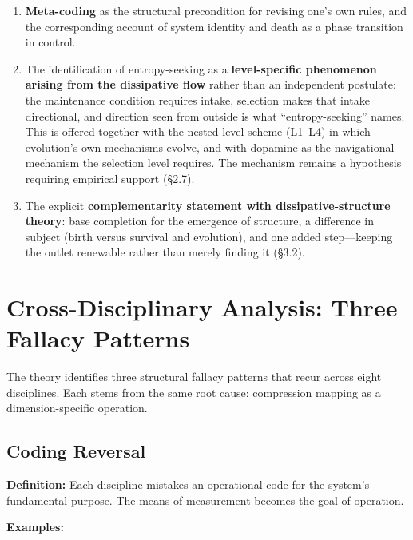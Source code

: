 \documentclass[11pt,a4paper]{article}
\begin{document}
\begin{enumerate}
    \item \textbf{Meta-coding} as the structural precondition for revising one's own rules, and the corresponding account of system identity and death as a phase transition in control.

    \item The identification of entropy-seeking as a \textbf{level-specific phenomenon arising from the dissipative flow} rather than an independent postulate: the maintenance condition requires intake, selection makes that intake directional, and direction seen from outside is what ``entropy-seeking'' names. This is offered together with the nested-level scheme (L1--L4) in which evolution's own mechanisms evolve, and with dopamine as the navigational mechanism the selection level requires. The mechanism remains a hypothesis requiring empirical support (\S2.7).

    \item The explicit \textbf{complementarity statement with dissipative-structure theory}: base completion for the emergence of structure, a difference in subject (birth versus survival and evolution), and one added step---keeping the outlet renewable rather than merely finding it (\S3.2).
\end{enumerate}

\section{Cross-Disciplinary Analysis: Three Fallacy Patterns}

The theory identifies three structural fallacy patterns that recur across eight disciplines. Each stems from the same root cause: compression mapping as a dimension-specific operation.

\subsection{Coding Reversal}

\textbf{Definition:} Each discipline mistakes an operational code for the system's fundamental purpose. The means of measurement becomes the goal of operation.

\textbf{Examples:}
\end{document}
